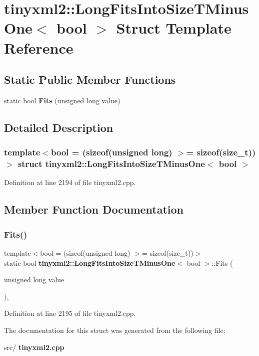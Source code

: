 \section{tinyxml2\+::Long\+Fits\+Into\+Size\+T\+Minus\+One$<$ bool $>$ Struct Template Reference}
\label{structtinyxml2_1_1_long_fits_into_size_t_minus_one}
\subsection*{Static Public Member Functions}
\begin{DoxyCompactItemize}
\item 
static bool \textbf{ Fits} (unsigned long value)
\end{DoxyCompactItemize}


\subsection{Detailed Description}
\subsubsection*{template$<$bool = (sizeof(unsigned long) $>$= sizeof(size\+\_\+t))$>$\newline
struct tinyxml2\+::\+Long\+Fits\+Into\+Size\+T\+Minus\+One$<$ bool $>$}



Definition at line 2194 of file tinyxml2.\+cpp.



\subsection{Member Function Documentation}
\mbox{\label{structtinyxml2_1_1_long_fits_into_size_t_minus_one_a3057710104ab733963eb32fda0bc374c}} 
\subsubsection{Fits()}
{\footnotesize\ttfamily template$<$bool  = (sizeof(unsigned long) $>$= sizeof(size\+\_\+t))$>$ \\
static bool \textbf{ tinyxml2\+::\+Long\+Fits\+Into\+Size\+T\+Minus\+One}$<$ bool $>$\+::Fits (\begin{DoxyParamCaption}\item[{unsigned long}]{value }\end{DoxyParamCaption})\hspace{0.3cm}{\ttfamily [inline]}, {\ttfamily [static]}}



Definition at line 2195 of file tinyxml2.\+cpp.



The documentation for this struct was generated from the following file\+:\begin{DoxyCompactItemize}
\item 
src/\textbf{ tinyxml2.\+cpp}\end{DoxyCompactItemize}
